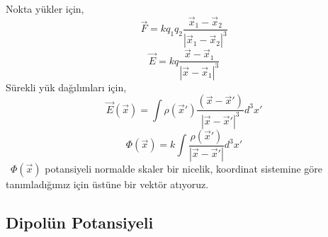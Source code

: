 \begin{tcolorbox}
 Nokta yükler için,
\[ \Vec{F} = k q_{1} q_{2} \dfrac{\Vec{x}_{1} - \Vec{x}_{2} }{|\Vec{x}_{1} - \Vec{x}_{2}|^{3}} \]
\[ \Vec{E} = k q \dfrac{\Vec{x} - \Vec{x}_{1}}{|\Vec{x} - \Vec{x}_{1}|^{3}}  \]
Sürekli yük dağılımları için,
\[ \Vec{E}(\Vec{x}) = \int \rho (\Vec{x}') \dfrac{(\Vec{x} - \Vec{x}')}{|\Vec{x} - \Vec{x}'|^{3}} d^{3} x'  \]  
\[ \Phi (\Vec{x}) = k \int  \dfrac{\rho (\Vec{x}')}{|\Vec{x} - \Vec{x}'|} d^{3} x' \]
\dangersign \ $\Phi (\Vec{x})$ potansiyeli normalde skaler bir nicelik, koordinat sistemine göre tanımladığımız için üstüne bir vektör atıyoruz.
\end{tcolorbox}

\newpage

\subsection{Dipolün Potansiyeli}
